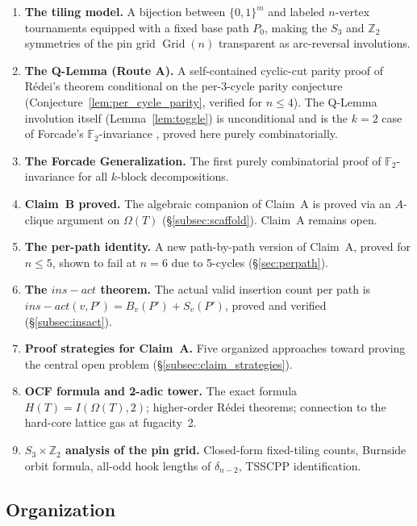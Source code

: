 \documentclass[12pt,reqno]{amsart}
\theoremstyle{plain}
\theoremstyle{definition}
\theoremstyle{remark}
\DeclareMathOperator{\Grid}{Grid}
\newcommand{\routeA}{\textcolor{axisteal}{\textbf{Route~A}}}
\newcommand{\insact}{\mathrm{ins}_{\mathrm{act}}}
\renewcommand{\routeA}{Route A}%
\renewcommand{\insact}{ins-act}%
\begin{document}
\noindent\begin{contribbox}
\begin{enumerate}[label=\textbf{\arabic*.},leftmargin=1.4em,itemsep=4pt]
  \item \textbf{The tiling model.} A bijection between $\{0,1\}^m$ and
    labeled $n$-vertex tournaments equipped with a fixed base path $P_0$,
    making the $S_3$ and $\mathbb{Z}_2$ symmetries of the pin grid $\Grid(n)$
    transparent as arc-reversal involutions.
  \item \textbf{The Q-Lemma (\routeA).} A self-contained cyclic-cut parity
    proof of Rédei's theorem conditional on the per-3-cycle parity conjecture
    (Conjecture~\ref{lem:per_cycle_parity}, verified for $n\le4$). The
    Q-Lemma involution itself (Lemma~\ref{lem:toggle}) is unconditional and
    is the $k=2$ case of Forcade's
    $\mathbb{F}_2$-invariance \cite{forcade1973}, proved here purely
    combinatorially.
  \item \textbf{The Forcade Generalization.} The first purely combinatorial
    proof of $\mathbb{F}_2$-invariance for all $k$-block decompositions.
  \item \textbf{Claim~B proved.} The algebraic companion of Claim~A is
    proved via an $A$-clique argument on $\Omega(T)$ (\S\ref{subsec:scaffold}).
    Claim~A remains open.
  \item \textbf{The per-path identity.} A new path-by-path version of
    Claim~A, proved for $n \leq 5$, shown to fail at $n=6$ due to
    5-cycles (\S\ref{sec:perpath}).
  \item \textbf{The $\insact$ theorem.} The actual valid insertion count per
    path is $\insact(v,P') = B_v(P') + S_v(P')$, proved and verified
    (\S\ref{subsec:insact}).
  \item \textbf{Proof strategies for Claim~A.} Five organized approaches
    toward proving the central open problem (\S\ref{subsec:claim_strategies}).
  \item \textbf{OCF formula and 2-adic tower.} The exact formula
    $H(T)=I(\Omega(T),2)$; higher-order Rédei theorems; connection to
    the hard-core lattice gas at fugacity~2.
  \item \textbf{$S_3\times\mathbb{Z}_2$ analysis of the pin grid.}
    Closed-form fixed-tiling counts, Burnside orbit formula, all-odd hook
    lengths of $\delta_{n-2}$, TSSCPP identification.
\end{enumerate}
\end{contribbox}

\subsection{Organization}
\end{document}
